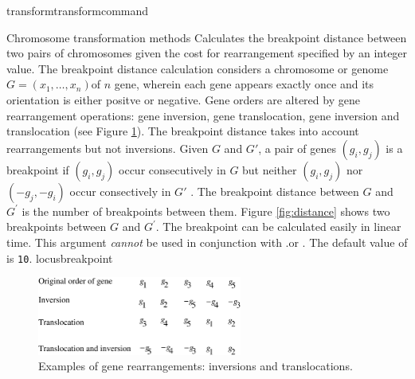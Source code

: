 \begin{command}{transform}{transformcommand}
\begin{arguments}
\begin{argumentgroup}{Chromosome transformation methods}
                {Calculates the breakpoint distance \cite{blanchetteetal1997}
                between two pairs of chromosomes given the cost for rearrangement
                specified by an integer value.  The breakpoint distance calculation considers
                a chromosome or genome $G = (x_1, \ldots, x_n)$of $n$ gene, wherein each
                gene appears exactly once and its orientation is either positve or negative.  Gene
                orders are altered by gene rearrangement operations: gene inversion, gene translocation,
                gene inversion and translocation (see Figure \ref{fig:genomeRearrangement}).  
                The breakpoint distance takes into account rearrangements but not inversions.
                Given $G$ and $G'$, a pair of genes $(g_i, g_j)$ is a breakpoint if $(g_i, g_j)$ occur 
                consecutively in $G$ but neither $(g_i, g_j)$ nor $(-g_j, -g_i)$ occur
                consectively in $G'$  \cite{sankoffandblanchette1998}.  The breakpoint distance between $G$
		        and $G^\prime$ is the number of breakpoints between them.  Figure \ref{fig:distance} 
                shows two breakpoints between $G$ and $G^\prime$. The breakpoint can be calculated 
                easily in linear time.  This argument \emph{cannot} be used in
                conjunction with .or . The default
                value of  is \texttt{10}.} 
                {locusbreakpoint} 
            
		    \begin{figure} [!htbp]
   		        \begin{center}
        		    \includegraphics[width=0.6\textwidth]{doc/figures/genomeRearrangement.pdf}
    		    \end{center}
    		    \caption{Examples of gene rearrangements: inversions and translocations.}
		        \label{fig:genomeRearrangement}
		    \end{figure}


\end{argumentgroup}
\end{arguments}
\end{command}
